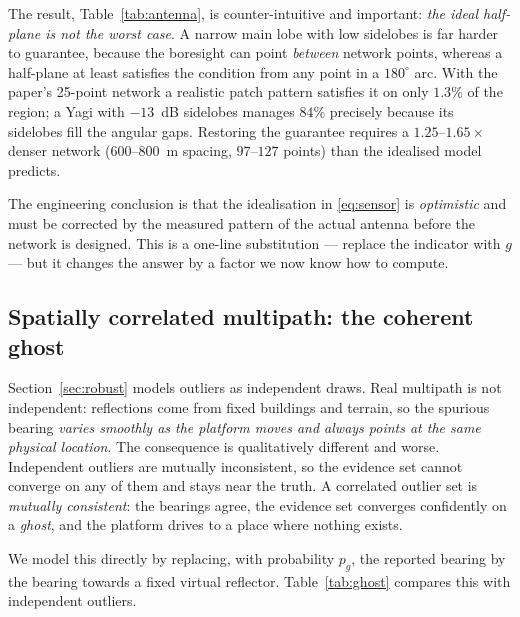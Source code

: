 \documentclass[journal,10pt]{IEEEtran}
\theoremstyle{definition}
\begin{document}
The result, Table~\ref{tab:antenna}, is counter-intuitive and important: \emph{the ideal
half-plane is not the worst case}. A narrow main lobe with low sidelobes is far harder to
guarantee, because the boresight can point \emph{between} network points, whereas a half-plane at
least satisfies the condition from any point in a $180^\circ$ arc. With the paper's 25-point
network a realistic patch pattern satisfies it on only $1.3\%$ of the region; a Yagi with $-13$~dB
sidelobes manages $84\%$ precisely because its sidelobes fill the angular gaps. Restoring the
guarantee requires a $1.25$--$1.65\times$ denser network ($600$--$800$~m spacing,
$97$--$127$ points) than the idealised model predicts.

The engineering conclusion is that the idealisation in \eqref{eq:sensor} is \emph{optimistic} and
must be corrected by the measured pattern of the actual antenna before the network is designed.
This is a one-line substitution --- replace the indicator with $g$ --- but it changes the answer by
a factor we now know how to compute.

\subsection{Spatially correlated multipath: the coherent ghost}
\label{sec:ghost}

Section~\ref{sec:robust} models outliers as independent draws. Real multipath is not independent:
reflections come from fixed buildings and terrain, so the spurious bearing \emph{varies smoothly as
the platform moves and always points at the same physical location}. The consequence is
qualitatively different and worse. Independent outliers are mutually inconsistent, so the evidence
set cannot converge on any of them and stays near the truth. A correlated outlier set is
\emph{mutually consistent}: the bearings agree, the evidence set converges confidently on a
\emph{ghost}, and the platform drives to a place where nothing exists.

We model this directly by replacing, with probability $p_g$, the reported bearing by the bearing
towards a fixed virtual reflector. Table~\ref{tab:ghost} compares this with independent outliers.
\end{document}

